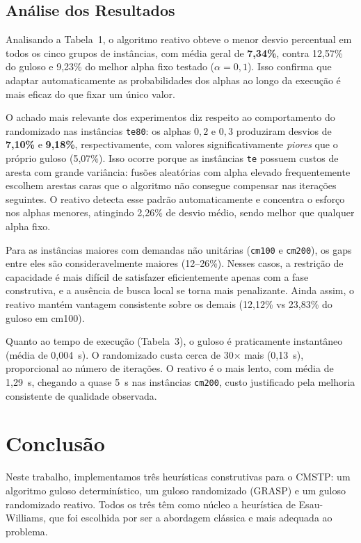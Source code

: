 \documentclass[12pt, a4paper]{article}
\begin{document}
\subsection{Análise dos Resultados}

Analisando a Tabela~1, o algoritmo reativo obteve o menor desvio percentual em todos os cinco grupos de instâncias, com média geral de \textbf{7,34\%}, contra 12,57\% do guloso e 9,23\% do melhor alpha fixo testado ($\alpha = 0{,}1$). Isso confirma que adaptar automaticamente as probabilidades dos alphas ao longo da execução é mais eficaz do que fixar um único valor.

O achado mais relevante dos experimentos diz respeito ao comportamento do randomizado nas instâncias \texttt{te80}: os alphas $0{,}2$ e $0{,}3$ produziram desvios de \textbf{7,10\%} e \textbf{9,18\%}, respectivamente, com valores significativamente \textit{piores} que o próprio guloso (5,07\%). Isso ocorre porque as instâncias \texttt{te} possuem custos de aresta com grande variância: fusões aleatórias com alpha elevado frequentemente escolhem arestas caras que o algoritmo não consegue compensar nas iterações seguintes. O reativo detecta esse padrão automaticamente e concentra o esforço nos alphas menores, atingindo 2,26\% de desvio médio, sendo melhor que qualquer alpha fixo.

Para as instâncias maiores com demandas não unitárias (\texttt{cm100} e \texttt{cm200}), os gaps entre eles são consideravelmente maiores (12--26\%). Nesses casos, a restrição de capacidade é mais difícil de satisfazer eficientemente apenas com a fase construtiva, e a ausência de busca local se torna mais penalizante. Ainda assim, o reativo mantém vantagem consistente sobre os demais (12,12\% vs 23,83\% do guloso em cm100).

Quanto ao tempo de execução (Tabela~3), o guloso é praticamente instantâneo (média de 0,004~s). O randomizado custa cerca de 30× mais (0,13~s), proporcional ao número de iterações. O reativo é o mais lento, com média de 1,29~s, chegando a quase 5~s nas instâncias \texttt{cm200}, custo justificado pela melhoria consistente de qualidade observada.

\section{Conclusão}

Neste trabalho, implementamos três heurísticas construtivas para o CMSTP: um algoritmo guloso determinístico, um guloso randomizado (GRASP) e um guloso randomizado reativo. Todos os três têm como núcleo a heurística de Esau-Williams, que foi escolhida por ser a abordagem clássica e mais adequada ao problema.
\end{document}
